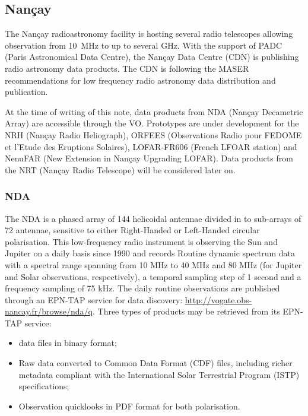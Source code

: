 \documentclass[11pt,a4paper]{ivoatex/ivoa}
\begin{document}
{\subsection{Nan\c cay}
\label{sec:Nancay}

The Nan\c cay radioastronomy facility is hosting several radio telescopes allowing observation from 
10~MHz to up to several GHz. With the support of PADC (Paris Astronomical Data Centre), the Nan\c cay 
Data Centre (CDN) is publishing radio astronomy data products. The CDN is following the MASER \cite{10.5334/dsj-2020-012}
recommendations for low frequency radio astronomy data distribution and publication. 

At the time of writing of this note, data products from NDA (Nan\c cay Decametric Array) are accessible 
through the VO. Prototypes are under development for the NRH (Nan\c cay Radio Heliograph), ORFEES 
(Observations Radio pour FEDOME et l'Etude des Eruptions Solaires), LOFAR-FR606 (French LFOAR station) 
and NenuFAR (New Extension in Nan\c cay Upgrading LOFAR). Data products from the NRT (Nan\c cay Radio 
Telescope) will be considered later on. 


\subsubsection{NDA}
The NDA is a phased array of 144 helicoidal antennae divided in to sub-arrays of 72 antennae, sensitive 
to either Right-Handed or Left-Handed circular polarisation. This low-frequency radio instrument is
observing the Sun and Jupiter on a daily basis since 1990 and records Routine dynamic spectrum data with 
a spectral range spanning from 10 MHz to 40 MHz and 80 MHz (for Jupiter and Solar observations, 
respectively), a temporal sampling step of 1 second and a frequency sampling of 75 kHz. The daily 
routine observations are published through an EPN-TAP service for data discovery: 
\url{http://vogate.obs-nancay.fr/browse/nda/q}. Three types of products may be retrieved from its 
EPN-TAP service:
\begin{itemize}
\item data files in binary format;
\item Raw data converted to Common Data Format (CDF) files, including richer metadata compliant with the 
International Solar Terrestrial Program (ISTP) specifications;
\item Observation quicklooks in PDF format for both polarisation.
\end{itemize}

}
\end{document}
